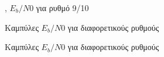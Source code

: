 \begin{figure}[H]
\caption{, $E_b/N0$ για ρυθμό 9/10}
\end{figure}

\begin{figure}[H]
\caption{Καμπύλες  $E_b/N0$ για διαφορετικούς ρυθμούς}
\end{figure}

\begin{figure}[H]
\caption{Καμπύλες  $E_b/N0$ για διαφορετικούς ρυθμούς}
\end{figure}

